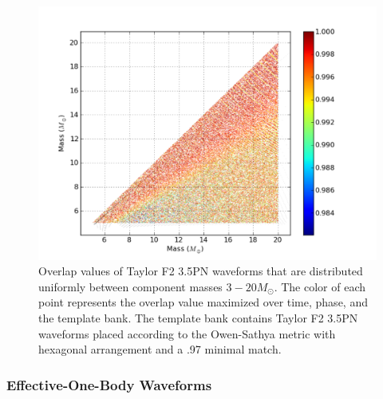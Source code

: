 \documentclass[aps,
prd,
amsmath,
amssymb,
twocolumn,
floatfix,
groupedaddress]{revtex4-1}
\begin{document}
\begin{figure}
\includegraphics[scale=0.04, clip=false, totalheight=0.3\textheight]{taylorf2-35pn-bank.pdf}
\caption{\label{fig:taylorf2-35PN-bank}Overlap values of Taylor F2 3.5PN waveforms that are distributed uniformly
 between component masses $3 -20 M_{\odot}$. The color of each point represents the overlap value maximized over 
 time, phase, and the template bank. The template bank contains Taylor F2 3.5PN waveforms placed according to the
  Owen-Sathya metric with hexagonal arrangement and a .97 minimal match.}
\end{figure}



\subsubsection{Effective-One-Body Waveforms}
\end{document}
